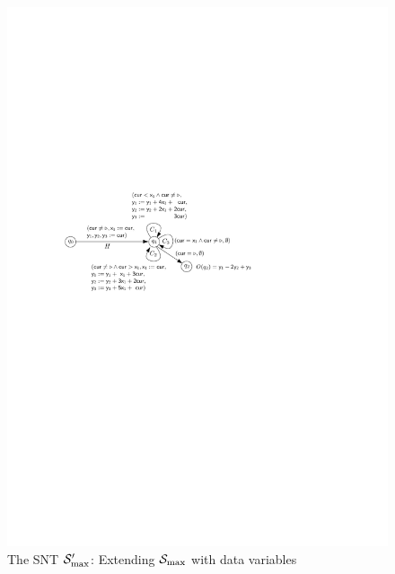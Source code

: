 \begin{example}
\begin{figure}[htbp]
\begin{center}
\includegraphics[scale=0.9]{dec-proc-snt-exmp.pdf}
\caption{The SNT ${\mathcal{S} }'_{\max}$: Extending ${\mathcal{S} }_{\max}$ with data variables}\label{fig-dec-proc-snt-exmp}
\end{center}
\end{figure}
%
\end{example}
